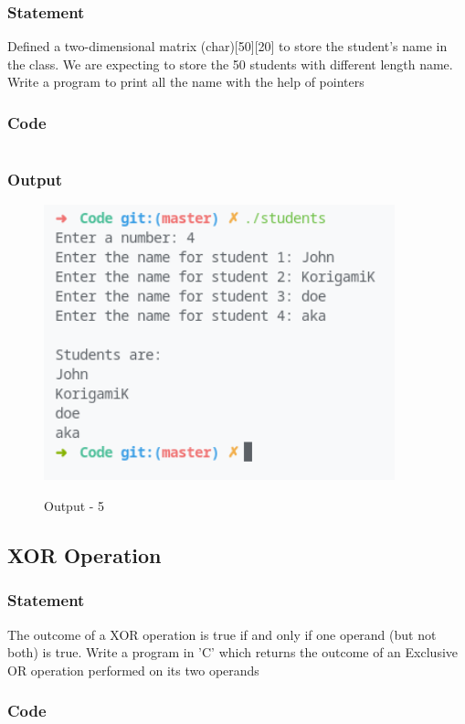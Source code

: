 \subsubsection{Statement}
Defined a two-dimensional matrix (char)[50][20] to store the student’s name in the class.
We are expecting to store the 50 students with different length name. Write a program to print all
the name with the help of pointers

\subsubsection{Code}
\inputminted[]{c}{../Code/students.cpp}
\subsubsection{Output}
\begin{figure}[!htb]
  \centering
  \includegraphics[width=4in]{Images/student_names.png}
  \label{Output-5}
  \caption{Output - 5}
\end{figure}

\pagebreak
\subsection{XOR Operation}

\subsubsection{Statement}
The outcome of a XOR operation is true if and only if one operand (but not both) is true. Write
a program in 'C' which returns the outcome of an Exclusive OR operation performed on its two
operands

\subsubsection{Code}
\inputminted[]{c}{../Code/xor.cpp}
